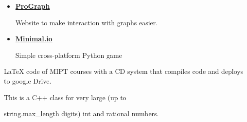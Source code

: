 
{\href{https://github.com/Unicorn-Dev}{}}
\begin{itemize}
\item \href{https://github.com/Unicorn-Dev/ProGraph}
{\textbf{ProGraph}}

Website to make interaction with graphs easier.

\item \href{https://github.com/Unicorn-Dev/Minimal.io}
{\textbf{Minimal.io}}

Simple cross-platform Python game
\end{itemize}
\divider

{\href{https://github.com/MIPT-Group/Lectures_Tex_Club}
{}}
LaTeX code of MIPT courses with a CD system that compiles code and deploys to google Drive.

\divider

{\href{https://github.com/AlexFreik/MIPT-code/tree/master/projects/BigInteger\%26Rational}{}}
This is a C++ class for very large (up to 

string.max\_length digits) int and rational numbers.

